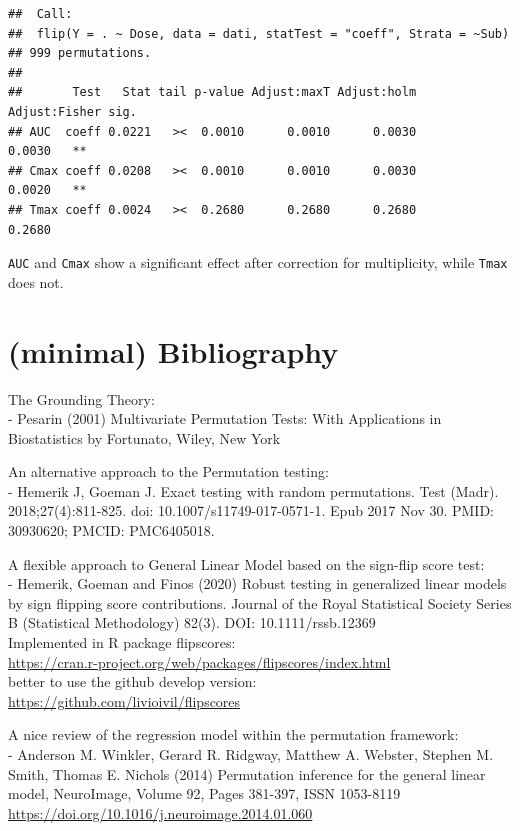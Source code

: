\documentclass[
]{article}
\begin{document}
\begin{verbatim}
##  Call:
##  flip(Y = . ~ Dose, data = dati, statTest = "coeff", Strata = ~Sub) 
## 999 permutations.
## 
##       Test   Stat tail p-value Adjust:maxT Adjust:holm Adjust:Fisher sig.
## AUC  coeff 0.0221   ><  0.0010      0.0010      0.0030        0.0030   **
## Cmax coeff 0.0208   ><  0.0010      0.0010      0.0030        0.0020   **
## Tmax coeff 0.0024   ><  0.2680      0.2680      0.2680        0.2680
\end{verbatim}

\texttt{AUC} and \texttt{Cmax} show a significant effect after
correction for multiplicity, while \texttt{Tmax} does not.

\hypertarget{minimal-bibliography}{%
\section{(minimal) Bibliography}\label{minimal-bibliography}}

The Grounding Theory:\\
- Pesarin (2001) Multivariate Permutation Tests: With Applications in
Biostatistics by Fortunato, Wiley, New York

An alternative approach to the Permutation testing:\\
- Hemerik J, Goeman J. Exact testing with random permutations. Test
(Madr). 2018;27(4):811-825. doi: 10.1007/s11749-017-0571-1. Epub 2017
Nov 30. PMID: 30930620; PMCID: PMC6405018.

A flexible approach to General Linear Model based on the sign-flip score
test:\\
- Hemerik, Goeman and Finos (2020) Robust testing in generalized linear
models by sign flipping score contributions. Journal of the Royal
Statistical Society Series B (Statistical Methodology) 82(3). DOI:
10.1111/rssb.12369\\
Implemented in R package flipscores:\\
\url{https://cran.r-project.org/web/packages/flipscores/index.html}~\\
better to use the github develop version:\\
\url{https://github.com/livioivil/flipscores}

A nice review of the regression model within the permutation
framework:\\
- Anderson M. Winkler, Gerard R. Ridgway, Matthew A. Webster, Stephen M.
Smith, Thomas E. Nichols (2014) Permutation inference for the general
linear model, NeuroImage, Volume 92, Pages 381-397, ISSN 1053-8119
\url{https://doi.org/10.1016/j.neuroimage.2014.01.060}
\end{document}
